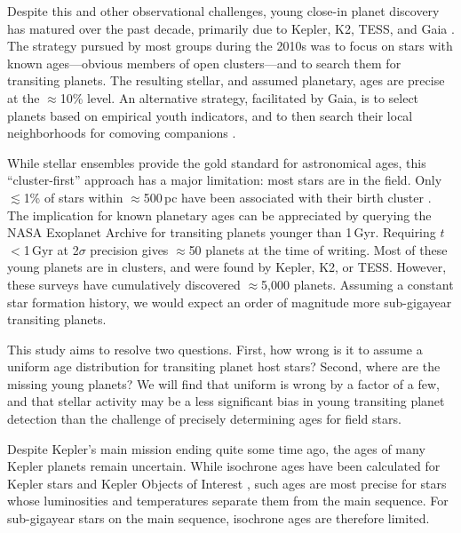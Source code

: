\documentclass[11pt,twocolumn,tighten]{aastex63}
\begin{document}
Despite this and other observational challenges, young close-in planet
discovery has matured over the past decade, primarily due to Kepler,
K2, TESS, and Gaia
\citep[e.g.][]{Meibom_2013,Mann_K2_25_2016,Curtis_2018,Livingston_2018,Bouma_2020_toi837,Plavchan_2020,Newton_2021,Nardiello_2022,Barber_2022,Zhou_2022,Zakhozhay_2022,Wood_2023}.
The strategy pursued by most groups during the 2010s was to focus on
stars with known ages---obvious members of open clusters---and to
search them for transiting planets.  The resulting stellar, and
assumed planetary, ages are precise at the $\approx$10\% level.  
An alternative strategy, facilitated by Gaia, is to select planets
based on empirical youth indicators, and to then search their local
neighborhoods for comoving companions \citep[e.g.][]{Tofflemire_2021}.

While stellar ensembles provide the gold standard for astronomical ages,
this ``cluster-first'' approach has a major limitation: most 
stars are in the field.  Only $\lesssim$1\% of stars within
$\approx$500\,pc have been associated with their birth cluster
\citep[e.g.][]{Zari_2018,CantatGaudin_2020,Kounkel_2020,Kerr_2021}.
The implication for known planetary ages can be appreciated by querying the NASA Exoplanet Archive
\citep[NEA;][]{2013PASP..125..989A} for transiting planets younger
than 1\,Gyr.  Requiring $t$$<$1\,Gyr at 2$\sigma$ precision gives
$\approx$50 planets at the time of writing.  Most of these young
planets are in clusters, and were found by Kepler, K2, or TESS.
However, these surveys have cumulatively discovered $\approx$5{,}000 planets.
Assuming a constant star formation history, we would expect an
order of magnitude more sub-gigayear transiting planets.

This study aims to resolve two questions.  First, how wrong is it to
assume a uniform age distribution for transiting planet host stars?
Second, where are the missing young planets?  We will find that
uniform is wrong by a factor of a few, and that stellar activity may
be a less significant bias in young transiting planet detection than
the challenge of precisely determining ages for field stars.

Despite Kepler's main mission ending quite some time ago, the ages of
many Kepler planets remain uncertain.  While isochrone ages have been
calculated for Kepler stars \citep{Berger_2020b_rpage} and Kepler
Objects of Interest \citep[KOIs;][]{Petigura_2022}, such ages are most
precise for stars whose luminosities and temperatures separate them
from the main sequence.  For sub-gigayear stars on the main sequence,
isochrone ages are therefore limited.
\end{document}
